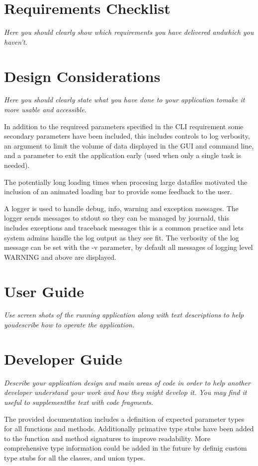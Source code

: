\documentclass[11pt]{article}
\begin{document}
\section{Requirements Checklist}
\emph{Here you should clearly show which requirements you have delivered andwhich you haven’t.}




\section{Design Considerations}
\emph{Here you should clearly state what you have done to your application tomake it more usable and accessible.}

In addition to the requireed parameters specified in the CLI requirement some secondary parameters have been included, this includes controls to log verbosity, an argument to limit the volume of data displayed in the GUI and command line, and a parameter to exit the application early (used when only a single task is needed).

The potentially long loading times when procesing large datafiles motivated the inclusion of an animated loading bar to provide some feedback to the user.

A logger is used to handle debug, info, warning and exception messages. The logger sends messages to stdout so they can be managed by journald, this includes exceptions and traceback messages this is a common practice and lets system admins handle the log output as they see fit. The verbosity of the log message can be set with the -v parameter, by default all messages of logging level WARNING and above are displayed.


\section{User Guide}
\emph{Use screen shots of the running application along with text descriptions to help youdescribe how to operate the application.}

\section{Developer Guide}
\emph{Describe your application design and main areas of code in order to help another developer understand your work and how they might develop it. You may find it useful to supplementthe text with code fragments.}

The provided documentation includes a definition of expected parameter types for all functions and methods. 
Additionally primative type stubs have been added to the function and method signatures to improve readability.
More comprehensive type information could be added in the future by definig custom type stubs for all the classes, and union types.
\end{document}
